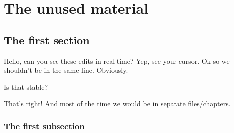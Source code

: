 \chapter{The unused material} \label{unused} %

\section{The first section}
Hello, can you see these edits in real time?
Yep, see your cursor.
Ok so we shouldn't be in the same line. Obviously. 

Is that stable?

That's right! And most of the time we would be in separate files/chapters.

\subsection{The first subsection}